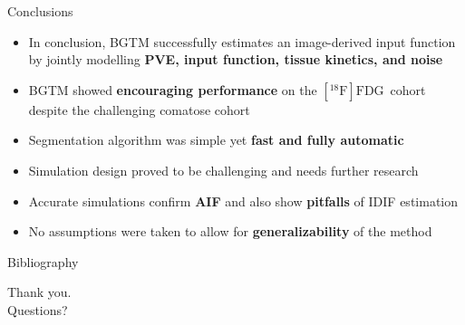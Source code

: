\documentclass[aspectratio=169]{beamer}
\newcommand{\fdg}{$[^{18}\mathrm{F}]\text{FDG}$}
\begin{document}
\begin{frame}{Conclusions}
	\begin{itemize}
		\setlength\itemsep{1.7em}
		\item In conclusion, BGTM successfully estimates an image-derived input function by jointly modelling \textbf{PVE, input function, tissue kinetics, and noise}
		\item BGTM showed \textbf{encouraging performance} on the \fdg\ cohort despite the challenging comatose cohort
		\item Segmentation algorithm was simple yet \textbf{fast and fully automatic}
		\item Simulation design proved to be challenging and needs further research
		\item Accurate simulations confirm \textbf{AIF} and also show \textbf{pitfalls} of IDIF estimation
		\item No assumptions were taken to allow for \textbf{generalizability} of the method
	\end{itemize}
\end{frame}

\begin{frame}{Bibliography}
    \tiny
    \printbibliography[heading=none]
\end{frame}

\begin{frame}
	\centering \huge{Thank you. \\ Questions?}
\end{frame}
\appendix
\end{document}
